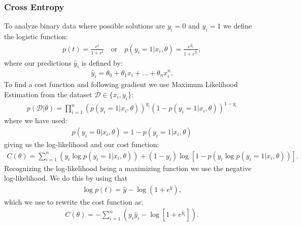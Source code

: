 \documentclass[11pt]{article}
\begin{document}
\subsubsection*{Cross Entropy}
To analyze binary data where possible solutions are $y_i=0$ and $y_i=1$ we define the logistic function:
\begin{align*}
    p(t) = \frac{e^{t}}{1 + e^t} \quad\text{or}\quad p(y_i =1 | x_i, \theta) = \frac{e^{\hat{y}_i}}{1+e^{\hat{y}_i}},
\end{align*}
where our predictions $\hat{y}_i$ is defined by:
\begin{align*}
    \hat{y}_i = \theta_0 + \theta_1 x_i +...+ \theta_n x_i^n.
\end{align*}
To find a cost function and following gradient we use Maximum Likelihood Estimation \cite{wiki} from the dataset $\mathcal{D} \in \{x_i, y_i\}$:
\begin{align*}
    p(\mathcal{D}|\theta) = \prod_{i=1}^n (p(y_i = 1|x_i,\theta))^{y_i}\left( 1- p(y_i = 1 | x_i, \theta)\right)^{1-y_i}
\end{align*}
where we have used:
\begin{align*}
    p(y_i=0|x_i, \theta ) = 1 - p(y_i=1 | x_i, \theta)
\end{align*}
giving us the log-likelihood and our cost function:
\begin{align*}
    C(\theta) = \sum_{i=1}^n (y_i \log p(y_i =1 | x_i, \theta)) + (1- y_i) \log [1 - p(y_i \log p(y_i =1 | x_i, \theta))].
\end{align*}
Recognizing the log-likelihood being a maximizing function we use the negative log-likelihood. We do this by using that
\begin{align*}
    \log p(t) = \hat{y} - \log(1+ e^{\hat{y}}),
\end{align*}
which we use to rewrite the cost function as:
\begin{align*}
    C(\theta) = -\sum_{i=1}^n (y_i \hat{y}_i - \log [1 + e^{\hat{y}_i}]).
\end{align*}
\end{document}
